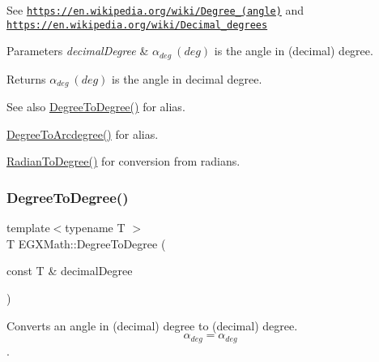 See \href{https://en.wikipedia.org/wiki/Degree_(angle)}{\tt https\+://en.\+wikipedia.\+org/wiki/\+Degree\+\_\+(angle)} and \href{https://en.wikipedia.org/wiki/Decimal_degrees}{\tt https\+://en.\+wikipedia.\+org/wiki/\+Decimal\+\_\+degrees} 
\begin{DoxyParams}{Parameters}
{\em decimal\+Degree} & $\alpha_{deg}\ (deg)$ is the angle in (decimal) degree. \\
\hline
\end{DoxyParams}
\begin{DoxyReturn}{Returns}
$\alpha_{deg}\ (deg)$ is the angle in decimal degree. 
\end{DoxyReturn}
\begin{DoxySeeAlso}{See also}
\mbox{\hyperlink{group___e_g_x_math-_angle_conversions-_degree_gaca157e7d3e99a46a11a04b92680d2574}{Degree\+To\+Degree()}} for alias. 

\mbox{\hyperlink{group___e_g_x_math-_angle_conversions-_degree_gac1b5f3b68f66c77a6df4ceef842c9b19}{Degree\+To\+Arcdegree()}} for alias. 

\mbox{\hyperlink{group___e_g_x_math-_angle_conversions-_radian_ga25bbce6cdc1c3621f2a158d320e3bc45}{Radian\+To\+Degree()}} for conversion from radians. 
\end{DoxySeeAlso}
\mbox{\label{group___e_g_x_math-_angle_conversions-_degree_gaca157e7d3e99a46a11a04b92680d2574}} 
\subsubsection{\texorpdfstring{Degree\+To\+Degree()}{DegreeToDegree()}}
{\footnotesize\ttfamily template$<$typename T $>$ \\
T E\+G\+X\+Math\+::\+Degree\+To\+Degree (\begin{DoxyParamCaption}\item[{const T \&}]{decimal\+Degree }\end{DoxyParamCaption})}



Converts an angle in (decimal) degree to (decimal) degree. \[\alpha_{deg}=\alpha_{deg}\]. 

